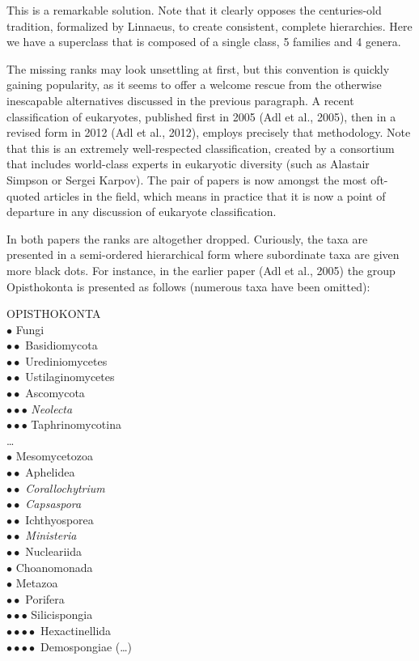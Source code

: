 \begin{artengenv}
This is a remarkable solution. Note that it clearly opposes the centuries-old tradition, formalized by Linnaeus, to
create consistent, complete hierarchies. Here we have a superclass that is composed of a single class, 5 families and 4
genera.

The missing ranks may look unsettling at first, but this convention is quickly gaining popularity, as it seems to offer
a welcome rescue from the otherwise inescapable alternatives discussed in the previous paragraph. A recent
classification of eukaryotes, published first in 2005 \label{ref:RND5C0kzbt9Jm}(Adl et al., 2005), then in a revised
form in 2012 \label{ref:RND2nC4dhq2C7}(Adl et al., 2012), employs precisely that methodology. Note that this is an
extremely well-respected classification, created by a consortium that includes world-class experts in eukaryotic
diversity (such as Alastair Simpson or Sergei Karpov). The pair of papers is now amongst the most oft-quoted articles
in the field, which means in practice that it is now a point of departure in any discussion of eukaryote
classification.

In both papers the ranks are altogether dropped. Curiously, the taxa are presented in a semi-ordered hierarchical form
where subordinate taxa are given more black dots. For instance, in the earlier paper \label{ref:RNDFR1OTfHJvd}(Adl et
al., 2005) the group Opisthokonta is presented as follows (numerous taxa have been omitted):

\noindent OPISTHOKONTA\\
$\bullet$ Fungi\\
$\bullet\bullet$ Basidiomycota\\
$\bullet\bullet$ Urediniomycetes\\
$\bullet\bullet$ Ustilaginomycetes\\
$\bullet\bullet$ Ascomycota\\
$\bullet\bullet$$\bullet$ \textit{Neolecta}\\
$\bullet\bullet$$\bullet$ Taphrinomycotina\\
\ldots\\
$\bullet$ Mesomycetozoa\\
$\bullet\bullet$ Aphelidea\\
$\bullet\bullet$ \textit{Corallochytrium}\\
$\bullet\bullet$ \textit{Capsaspora}\\
$\bullet\bullet$ Ichthyosporea\\
$\bullet\bullet$ \textit{Ministeria}\\
$\bullet\bullet$ Nucleariida\\
$\bullet$ Choanomonada\\
$\bullet$ Metazoa\\
$\bullet\bullet$ Porifera\\
$\bullet\bullet$$\bullet$ Silicispongia\\
$\bullet\bullet$$\bullet\bullet$ Hexactinellida\\
$\bullet\bullet$$\bullet\bullet$ Demospongiae (\ldots)


\end{artengenv}
